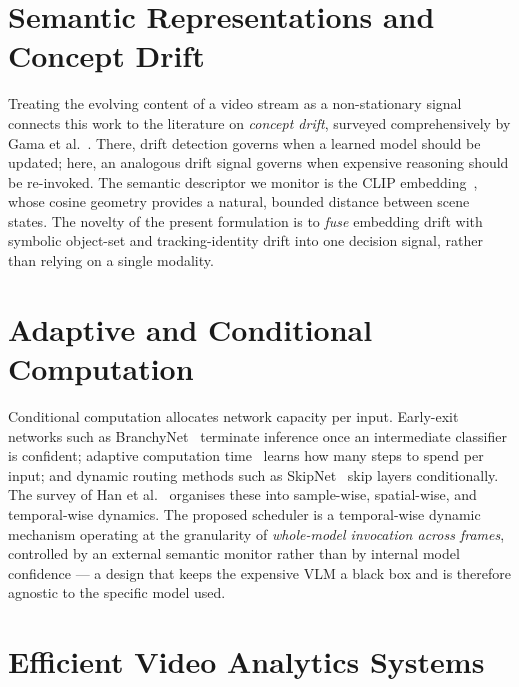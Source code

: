 \section{Semantic Representations and Concept Drift}
\label{sec:lit-drift}

Treating the evolving content of a video stream as a non-stationary signal
connects this work to the literature on \emph{concept drift}, surveyed
comprehensively by Gama et al.~\cite{Gama2014Drift}. There, drift detection
governs when a learned model should be updated; here, an analogous drift
signal governs when expensive reasoning should be re-invoked. The semantic
descriptor we monitor is the CLIP embedding~\cite{Radford2021CLIP}, whose
cosine geometry provides a natural, bounded distance between scene states.
The novelty of the present formulation is to \emph{fuse} embedding drift with
symbolic object-set and tracking-identity drift into one decision signal,
rather than relying on a single modality.

\section{Adaptive and Conditional Computation}
\label{sec:lit-adaptive}

Conditional computation allocates network capacity per input. Early-exit
networks such as BranchyNet~\cite{Teerapittayanon2016BranchyNet} terminate
inference once an intermediate classifier is confident; adaptive computation
time~\cite{Graves2017Adaptive} learns how many steps to spend per input; and
dynamic routing methods such as SkipNet~\cite{Wang2018SkipNet} skip layers
conditionally. The survey of Han et al.~\cite{Han2021DynamicSurvey} organises
these into sample-wise, spatial-wise, and temporal-wise dynamics. The
proposed scheduler is a temporal-wise dynamic mechanism operating at the
granularity of \emph{whole-model invocation across frames}, controlled by an
external semantic monitor rather than by internal model confidence --- a design
that keeps the expensive VLM a black box and is therefore agnostic to the
specific model used.

\section{Efficient Video Analytics Systems}
\label{sec:lit-analytics}

